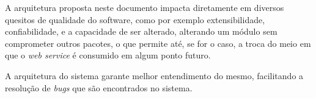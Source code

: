 A arquitetura proposta neste documento impacta diretamente em diversos quesitos de qualidade do software, como por exemplo extensibilidade, confiabilidade, e a capacidade de ser alterado, alterando um módulo sem comprometer outros pacotes, o que permite até, se for o caso, a troca do meio em que o \textit{web service} é consumido em algum ponto futuro.

A arquitetura do sistema garante melhor entendimento do mesmo, facilitando a resolução de \textit{bugs} que são encontrados no sistema.